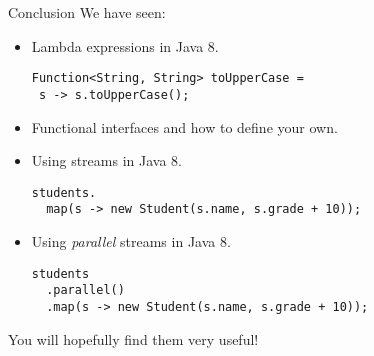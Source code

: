 \documentclass{beamer}
\begin{document}
\begin{frame}[fragile]{Conclusion}
  We have seen:

  \begin{itemize}
  \pause{} \item Lambda expressions in Java 8.
    \begin{lstlisting}[basicstyle=\footnotesize\ttfamily]
Function<String, String> toUpperCase =
 s -> s.toUpperCase();
    \end{lstlisting}
  \pause{} \item Functional interfaces and how to define your own.
  \pause{} \item Using streams in Java 8.
    \begin{lstlisting}[basicstyle=\footnotesize\ttfamily]
students.
  map(s -> new Student(s.name, s.grade + 10));
    \end{lstlisting}
  \pause{} \item Using \emph{parallel} streams in Java 8.
    \begin{lstlisting}[basicstyle=\footnotesize\ttfamily]
students
  .parallel()
  .map(s -> new Student(s.name, s.grade + 10));
    \end{lstlisting}
  \end{itemize}
  \pause{}
  You will hopefully find them very useful!
\end{frame}
\end{document}
